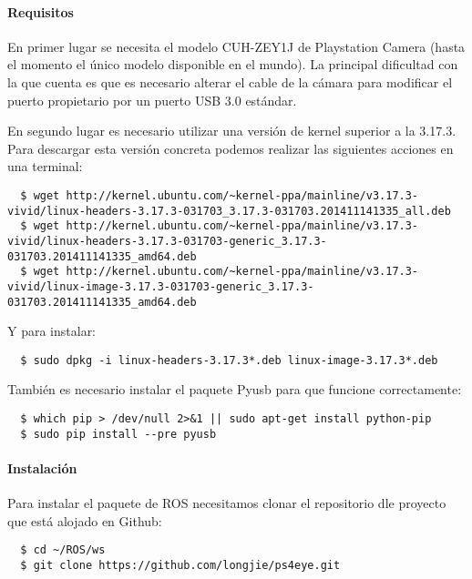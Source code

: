 \paragraph{Requisitos} \hspace{0pt}

En primer lugar se necesita el modelo CUH-ZEY1J de Playstation Camera (hasta el
momento el único modelo disponible en el mundo). La principal dificultad con la
que cuenta es que es necesario alterar el cable de la cámara para modificar el
puerto propietario por un puerto USB 3.0 estándar.

En segundo lugar es necesario utilizar una versión de kernel superior a la
3.17.3. Para descargar esta versión concreta podemos realizar las siguientes
acciones en una terminal:
\\
\begin{lstlisting}
  $ wget http://kernel.ubuntu.com/~kernel-ppa/mainline/v3.17.3-vivid/linux-headers-3.17.3-031703_3.17.3-031703.201411141335_all.deb
  $ wget http://kernel.ubuntu.com/~kernel-ppa/mainline/v3.17.3-vivid/linux-headers-3.17.3-031703-generic_3.17.3-031703.201411141335_amd64.deb
  $ wget http://kernel.ubuntu.com/~kernel-ppa/mainline/v3.17.3-vivid/linux-image-3.17.3-031703-generic_3.17.3-031703.201411141335_amd64.deb
\end{lstlisting}

Y para instalar:
\\
\begin{lstlisting}
  $ sudo dpkg -i linux-headers-3.17.3*.deb linux-image-3.17.3*.deb
\end{lstlisting}

También es necesario instalar el paquete Pyusb para que funcione correctamente:
\\
\begin{lstlisting}
  $ which pip > /dev/null 2>&1 || sudo apt-get install python-pip
  $ sudo pip install --pre pyusb
\end{lstlisting}

\paragraph{Instalación} \hspace{0pt}

Para instalar el paquete de ROS necesitamos clonar el repositorio dle proyecto
que está alojado en Github:
\\
\begin{lstlisting}
  $ cd ~/ROS/ws
  $ git clone https://github.com/longjie/ps4eye.git
\end{lstlisting}

